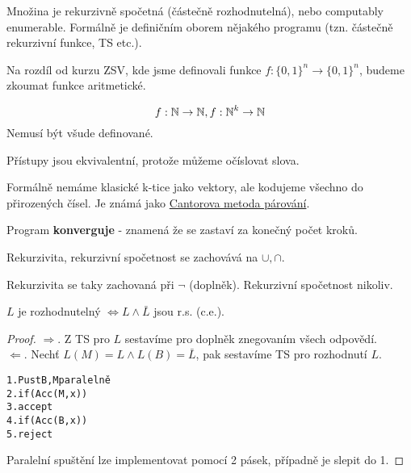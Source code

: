 \begin{definition}
	Množina je rekurzivně spočetná (částečně rozhodnutelná), nebo computably enumerable.
	Formálně je definičním oborem nějakého programu (tzn. částečně rekurzivní funkce, TS etc.).
\end{definition}

\begin{note}
	Na rozdíl od kurzu ZSV, kde jsme definovali funkce $f:\{0, 1\}^n \to \{0, 1\}^n$,
	budeme zkoumat funkce aritmetické.

	\[ f:\operatorname{\mathbb{N}} \to \operatorname{\mathbb{N}}, f:\operatorname{\mathbb{N}}^k \to \operatorname{\mathbb{N}} \]
	Nemusí být všude definované.

	Přístupy jsou ekvivalentní, protože můžeme očíslovat slova.
\end{note}

\begin{note}
	Formálně nemáme klasické k-tice jako vektory, ale kodujeme všechno do přirozených čísel.
	Je známá jako \href{https://en.wikipedia.org/wiki/Pairing_function}{Cantorova metoda párování}.
\end{note}

\begin{notation}[Konvergence]
	Program \textbf{konverguje} - znamená že se zastaví za konečný počet kroků.
\end{notation}

\begin{reminder}
	Rekurzivita, rekurzivní spočetnost se zachovává na $\cup, \cap$.

	Rekurzivita se taky zachovaná při $\neg$ (doplněk).
	Rekurzivní spočetnost nikoliv.
\end{reminder}

\begin{theorem}[Postova]\label{post}
	$L$ je rozhodnutelný $ \iff L \land \bar{L} $ jsou r.s. (c.e.).
\end{theorem}
\begin{proof}
$ \Rightarrow $. Z TS pro $L$ sestavíme pro doplněk znegovaním všech odpovědí. \\
$ \Leftarrow $. Nechť $L(M) = L \land L(B) = \bar{L} $, pak sestavíme TS pro rozhodnutí $L$.

\begin{alltt}
1. Pust B, M paralelně
2. if(Acc(M, x))
3. \tab accept
4. if(Acc(B, x))
5. reject
\end{alltt}

Paralelní spuštění lze implementovat pomocí 2 pásek, případně je slepit do 1.
\end{proof}

